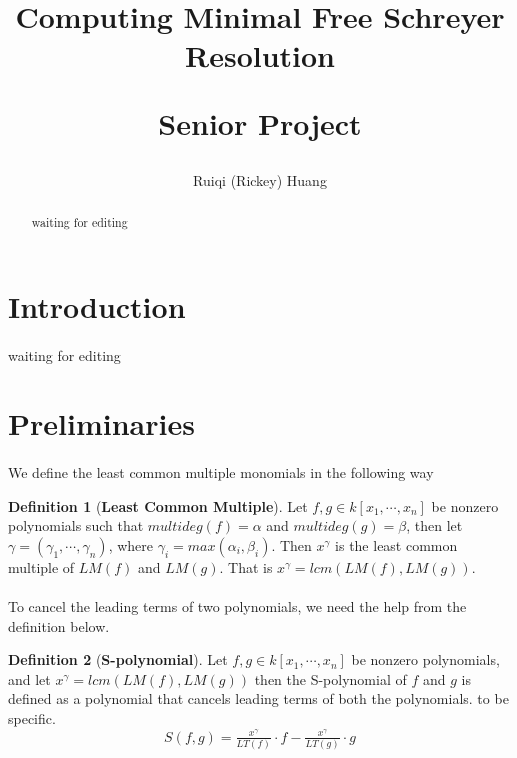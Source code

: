 \documentclass{article}
\title{Computing Minimal Free Schreyer Resolution\\
\begin{large} 
  Senior Project
\end{large}}
\author{Ruiqi (Rickey) Huang}
\theoremstyle{definition}
\newtheorem{definition}{Definition}[section]
\theoremstyle{remark}
\theoremstyle{example}
\begin{document}
\maketitle

\begin{abstract}
    \textcolor{BrickRed}{waiting for editing}
\end{abstract}

\section{Introduction}

\paragraph{  }

\textcolor{BrickRed}{waiting for editing}

\paragraph{  }

\section{Preliminaries}

\paragraph{  }

We define the least common multiple monomials in the following way
\begin{definition}[\textbf{Least Common Multiple}]
    Let $f, g \in k[x_1, \cdots, x_n]$ be nonzero polynomials such that $multideg(f) = \alpha$ and $multideg(g) = \beta$, then let $\gamma = (\gamma_1, \cdots, \gamma_n)$, where $\gamma_i = max(\alpha_i,\beta_i)$. Then $x^{\gamma}$ is the least common multiple of $LM(f)$ and $LM(g)$. That is $x^{\gamma} = lcm(LM(f), LM(g))$.
\end{definition}

\paragraph{  }
To cancel the leading terms of two polynomials, we need the help from the definition below.
\begin{definition}[\textbf{S-polynomial}]
    Let $f, g \in k[x_1, \cdots, x_n]$ be nonzero polynomials, and let $x^{\gamma} = lcm(LM(f), LM(g))$ then the S-polynomial of $f$ and $g$ is defined as a polynomial that cancels leading terms of both the polynomials. to be specific.
    \begin{equation}
        S(f,g) = \tfrac{x^{\gamma}}{LT(f)} \cdot f - \tfrac{x^{\gamma}}{LT(g)}\cdot g
    \end{equation}
\end{definition}
\end{document}
